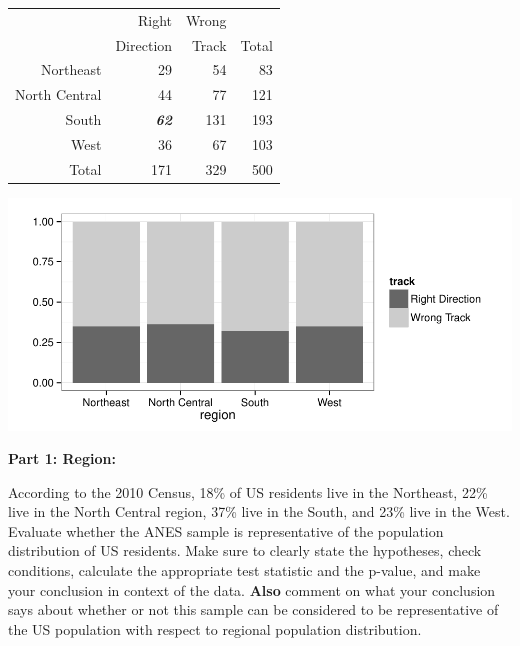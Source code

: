 \documentclass[12pt]{article}
\begin{document}
\begin{minipage}[c]{0.4\textwidth}
\begin{center}
\begin{tabular}{rrr|r}
  \hline
 & Right  & Wrong  &  \\ 
 &  Direction &  Track & Total \\ 
  \hline
Northeast & 29 & 54 & 83 \\ 
  North Central & 44 & 77 & 121 \\ 
  South & \textit{\textbf{62}} & 131 & 193 \\ 
  West & 36 & 67 & 103 \\ 
\hline
  Total & 171 & 329 & 500 \\ 
   \hline
\end{tabular}
\end{center}
\end{minipage}
\begin{minipage}[c]{0.6\textwidth}
\begin{center}
\includegraphics[width=\textwidth]{figures/anes_mosaic.pdf}
\end{center}
\end{minipage}

\pagebreak

\textbf{Part 1: Region:} 

According to the 2010 Census, 18\% of US residents live in the Northeast, 22\% live in the North 
Central region, 37\% live in the South, and 23\% live in the West. Evaluate whether the ANES sample 
is representative of the population distribution of US residents. Make sure to clearly state the hypotheses, 
check conditions, calculate the appropriate test statistic and the p-value, and make your conclusion in context 
of the data. \textbf{Also} comment on what your conclusion says about whether or not this sample can be 
considered to be representative of the US population with respect to regional population distribution. \\
\end{document}
